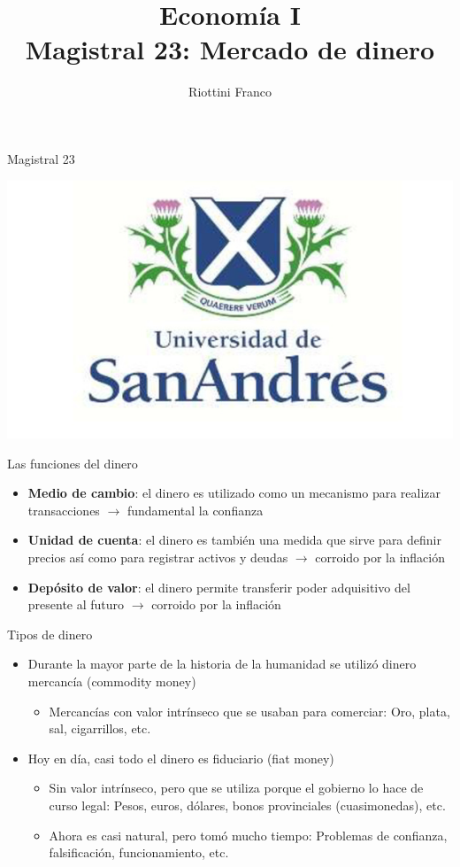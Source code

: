 \documentclass{beamer}
\title[Economía I]{Economía I \vspace{4mm}
\\ Magistral 23: Mercado de dinero}
\date{}
\author[Riottini]{Riottini Franco}
\institute[]{Universidad de San Andrés}
\begin{document}
\begin{frame}
\titlepage
\centering
Magistral 23

\includegraphics[scale=0.2]{../Figures/logoUDESA.jpg} 
\end{frame}

\begin{frame}{Las funciones del dinero}
    \begin{itemize}
        \item \textbf{Medio de cambio}: el dinero es utilizado como un mecanismo para realizar transacciones $\rightarrow$ fundamental la confianza
        \item \textbf{Unidad de cuenta}: el dinero es también una medida que sirve para definir precios así como para registrar activos y deudas $\rightarrow$ corroido por la inflación
        \item \textbf{Depósito de valor}: el dinero permite transferir poder adquisitivo del presente al futuro $\rightarrow$ corroido por la inflación
   \end{itemize}
\end{frame}

\begin{frame}{Tipos de dinero}
    \begin{itemize}
        \item Durante la mayor parte de la historia de la humanidad se utilizó dinero mercancía (commodity money)
            \begin{itemize}
                \item Mercancías con valor intrínseco que se usaban para comerciar: Oro, plata, sal, cigarrillos, etc.
            \end{itemize}
        \item Hoy en día, casi todo el dinero es fiduciario (fiat money)               
        \begin{itemize}
            \item Sin valor intrínseco, pero que se utiliza porque el gobierno lo hace de curso legal: Pesos, euros, dólares, bonos provinciales (cuasimonedas), etc.
            \item Ahora es casi natural, pero tomó mucho tiempo: Problemas de confianza, falsificación, funcionamiento, etc.
        \end{itemize}
    \end{itemize}
\end{frame}
\end{document}
